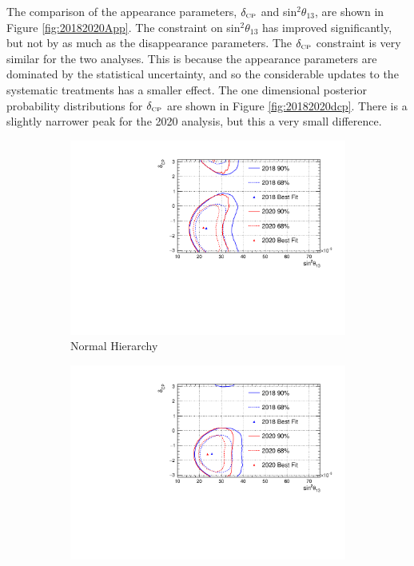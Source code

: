 The comparison of the appearance parameters, $\delta_{\scriptscriptstyle\mathrm{CP}}$ and sin$^{2}\theta_{13}$, are shown in Figure \ref{fig:20182020App}. The constraint on sin$^{2}\theta_{13}$ has improved significantly, but not by as much as the disappearance parameters. The $\delta_{\scriptscriptstyle\mathrm{CP}}$ constraint is very similar for the two analyses. This is because the appearance parameters are dominated by the statistical uncertainty, and so the considerable updates to the systematic treatments has a smaller effect. The one dimensional posterior probability distributions for $\delta_{\scriptscriptstyle\mathrm{CP}}$ are shown in Figure \ref{fig:20182020dcp}. There is a slightly narrower peak for the 2020 analysis, but this a very small difference.

\begin{figure}[!htbp]
\centering
\begin{subfigure}{.7\textwidth}
  \centering
  \includegraphics[width=0.95\linewidth]{figs/compMaCh3Contours_20182020/compMaCh3Contours_20182020_woRC_app_data_NH}
  \caption{Normal Hierarchy}
  \label{fig:20182020AppNH}
\end{subfigure}
\begin{subfigure}{.7\textwidth}
  \centering
  \includegraphics[width=0.95\linewidth]{figs/compMaCh3Contours_20182020/compMaCh3Contours_20182020_woRC_app_data_IH}

\end{subfigure}
\end{figure}

